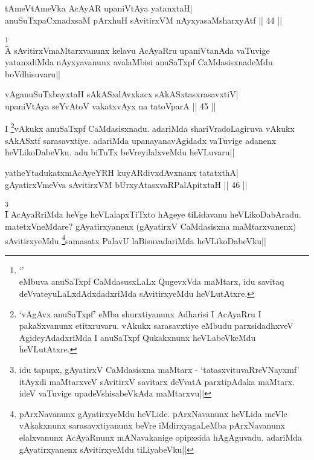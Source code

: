 
\begin{shl}
tAmeVtAmeVka AcAyAR upaniVtAya yatanxtaH| \\
anuSuTxpaCxnadxsaM pArxhuH sAvitirxVM nAyxyasaMsharxyAtf \hfill ||  44 || 
\end{shl}

\begin{artha} 
\footnote[1]{`\stext' \\ eMbuva anuSaTxpf CaMdasusxLaLx QugevxVda 
maMtarx, idu savitaq deVvateyuLaLxdAdxdadxriMda sAvitirxyeMdu 
heVLutAtxre.}\\
A sAvitirxVmaMtarxvanunx kelavu AcAyaRru upaniVtanAda vaTuvige 
yatanxdiMda nAyxyavanunx avalaMbisi anuSaTxpf CaMdasisxnadeMdu 
boVdhisuvaru||
\end{artha}


\begin{shl}
vAganuSuTxbayxtaH sAkASxdAvxkacx sAkASxtasxrasavxtiV| \\
upaniVtAya seYvAtoV vakatxvAyx na tatoV\s parA \hfill ||  45 || 
\end{shl}

\begin{artha} 
I \footnote[1]{`vAgAvx anuSaTxpf' eMba shurxtiyanunx Adharisi I 
AcAyaRru I pakaSxvanunx etitxruvaru. vAkukx sarasavxtiye eMbudu 
parxsidadhxveV AgideyAdadxriMda I anuSaTxpf Qukakxnunx heVLabeVkeMdu 
heVLutAtxre.}vAkukx anuSaTxpf CaMdasisxnadu. adariMda 
shariVradoLagiruva vAkukx sAkASxtf sarasavxtiye. adariMda 
upanayanavAgidadx vaTuvige adanenx heVLikoDabeVku. adu biTuTx 
beVreyilalxveMdu heVLuvaru||
\end{artha}


\begin{shl}
yatheYtadukatxmAcAyeYRH kuyARdivxdAvxnanx tatatxthA| \\
gAyatirxVmeVva sAvitirxVM bUrxyAtasxvaRPalApitxtaH \hfill ||  46 || 
\end{shl}

\begin{artha} 
\footnote[2]{idu tapupx, gAyatirxV CaMdasisxna maMtarx - 
`tatasxvituvaRreVNayxmf' itAyxdi maMtarxveV sAvitirxV savitarx deVvatA 
parxtipAdaka maMtarx. ideV vaTuvige upadeVshisabeVkAda maMtarxvu||}\\
I AcAyaRriMda heVge heVLalapxTiTxto hAgeye tiLidavanu heVLikoDabAradu. 
matetxVneMdare? gAyatirxyanenx (gAyatirxV CaMdasisxna maMtarxvanenx) 
sAvitirxyeMdu \footnote[2]{pArxNavanunx gAyatirxyeMdu heVLide. 
pArxNavanunx heVLida meVle vAkakxnunx sarasavxtiyanunx beVre 
iMdirxyagaLeMba pArxNavanunx elalxvanunx AcAyaRnunx mANavakanige 
opipxsida hAgAguvadu. adariMda gAyatirxyanenx sAvitirxyeMdu 
tiLiyabeVku||}samasatx PalavU laBisuvadariMda 
heVLikoDabeVku|| 
\end{artha}

